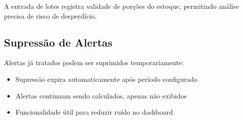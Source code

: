 \begin{infobox}
A entrada de lotes registra validade de porções do estoque, permitindo
análise precisa de risco de desperdício.
\end{infobox}

\subsection{Supressão de Alertas}

Alertas já tratados podem ser suprimidos temporariamente:

\begin{itemize}[leftmargin=2em]
  \item Supressão expira automaticamente após período configurado
  \item Alertas continuam sendo calculados, apenas não exibidos
  \item Funcionalidade útil para reduzir ruído no dashboard
\end{itemize}
